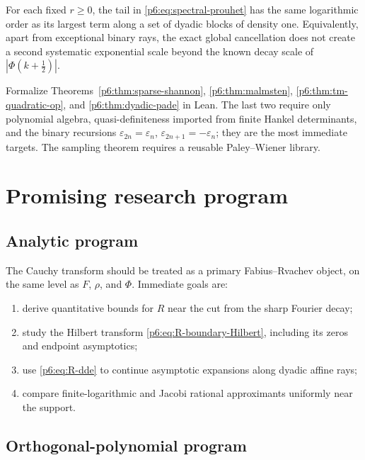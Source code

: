 \documentclass[11pt]{article}
\theoremstyle{definition}
\theoremstyle{remark}
\newcommand{\eps}{\varepsilon}
\begin{document}
\begin{conjecture}
\label{p6:conj:no-anomalous-cancellation}
For each fixed \(r\ge0\), the tail in \eqref{p6:eq:spectral-prouhet} has the same logarithmic
order as its largest term along a set of dyadic blocks of density one.  Equivalently, apart
from exceptional binary rays, the exact global cancellation does not create a second
systematic exponential scale beyond the known decay scale of
\(|\Phi(k+\tfrac12)|\).
\end{conjecture}

\begin{openproblem}
Formalize Theorems~\ref{p6:thm:sparse-shannon}, \ref{p6:thm:malmsten},
\ref{p6:thm:tm-quadratic-op}, and \ref{p6:thm:dyadic-pade} in Lean.  The last two require only
polynomial algebra, quasi-definiteness imported from finite Hankel determinants, and the
binary recursions \(\eps_{2n}=\eps_n\), \(\eps_{2n+1}=-\eps_n\); they are the most
immediate targets.  The sampling theorem requires a reusable Paley--Wiener library.
\end{openproblem}

\section{Promising research program}

\subsection{Analytic program}

The Cauchy transform should be treated as a primary Fabius--Rvachev object, on the same
level as \(F\), \(\rho\), and \(\Phi\).  Immediate goals are:

\begin{enumerate}
\item derive quantitative bounds for \(R\) near the cut from the sharp Fourier decay;
\item study the Hilbert transform \eqref{p6:eq:R-boundary-Hilbert}, including its zeros and
      endpoint asymptotics;
\item use \eqref{p6:eq:R-dde} to continue asymptotic expansions along dyadic affine rays;
\item compare finite-logarithmic and Jacobi rational approximants uniformly near the
      support.
\end{enumerate}

\subsection{Orthogonal-polynomial program}
\end{document}
